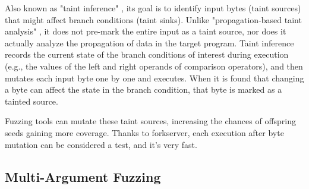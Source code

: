 %
Also known as "taint inference" \cite{aschermann2019redqueen,gan2020greyone,lemieux2018fairfuzz,you2019profuzzer}, its goal is to identify input bytes (taint sources) that might affect branch conditions (taint sinks). Unlike "propagation-based taint analysis" \cite{chen2018angora,rawat2017vuzzer,wang2010taintscope}, it does not pre-mark the entire input as a taint source, nor does it actually analyze the propagation of data in the target program. Taint inference records the current state of the branch conditions of interest during execution (e.g., the values of the left and right operands of comparison operators), and then mutates each input byte one by one and executes. When it is found that changing a byte can affect the state in the branch condition, that byte is marked as a tainted source.

Fuzzing tools can mutate these taint sources, increasing the chances of offspring seeds gaining more coverage. Thanks to forkserver, each execution after byte mutation can be considered a test, and it's very fast.

\subsection{Multi-Argument Fuzzing} %

